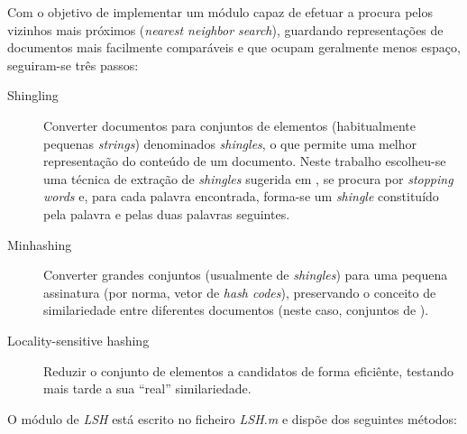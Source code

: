 \documentclass[a4paper,11pt,openright,oneside]{report}
\begin{document}
Com o objetivo de implementar um módulo capaz de efetuar a procura pelos vizinhos mais próximos (\textit{nearest neighbor search}), guardando representações de documentos mais facilmente comparáveis e que ocupam geralmente menos espaço, seguiram-se três passos:

\begin{description}
\item[Shingling]
Converter documentos para conjuntos de elementos (habitualmente pequenas \textit{strings}) denominados \textit{shingles}, o que permite uma melhor representação do conteúdo de um documento. Neste trabalho escolheu-se uma técnica de extração de \textit{shingles} sugerida em \cite{book1}, se procura por \textit{stopping words} e, para cada palavra encontrada, forma-se um \textit{shingle} constituído pela palavra e pelas duas palavras seguintes.
\item[Minhashing]
Converter grandes conjuntos (usualmente de \textit{shingles}) para uma pequena assinatura (por norma, vetor de \textit{hash codes}), preservando o conceito de similariedade entre diferentes documentos (neste caso, conjuntos de ).
\item[Locality-sensitive hashing]
Reduzir o conjunto de elementos a candidatos de forma eficiênte, testando mais tarde a sua ``real'' similariedade.
\end{description}

O módulo de \textit{LSH} está escrito no ficheiro \textit{LSH.m} e dispõe dos seguintes métodos:
\end{document}
